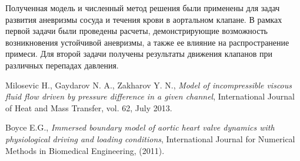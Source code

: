 \documentclass[11pt]{amsart}
\begin{document}
Полученная модель и численный метод решения были применены для задач развития аневризмы сосуда и течения крови в аортальном клапане. В рамках первой задачи были проведены расчеты, демонстрирующие возможность возникновения устойчивой аневризмы, а также ее влияние на распространение примеси. Для второй задачи получены результаты движения клапанов при различных перепадах давления.


%               
\small  
\begin{thebibliography}{99}

Milosevic H., Gaydarov N. A., Zakharov Y. N., {\textit{Model of incompressible viscous fluid flow driven by  pressure difference in a given channel}}, International Journal of Heat and Mass Transfer, vol. 62, July 2013.

Boyce E.G., {\textit{Immersed boundary model of aortic heart valve dynamics with physiological driving and loading conditions}}, International Journal for Numerical Methods in Biomedical Engineering, (2011).

\end{thebibliography}


\end{document}
